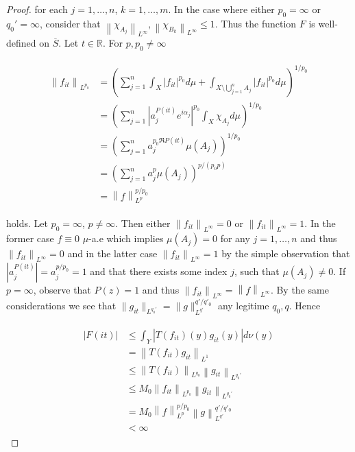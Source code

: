 \begin{proof}
for each $j = 1,\hdots,n$, $k = 1,\hdots,m$. In the case where either $p_0 = \infty$ or $q_0' = \infty$, consider that $\left\|\chi_{A_j} \right\|_{L^\infty}, \left\|\chi_{B_k}\right\|_{L^\infty} \leqslant 1 $. Thus the function $F$ is well-defined on $\overline{S}$. Let $t \in \mathbb{R}$. For $p,p_0 \neq \infty$

\begin{gather*}
	\begin{aligned}
		\left\|f_{it}\right\|_{L^{p_0}} &= \left(\sum_{j = 1}^n \int_X \left| f_{it} \right|^{p_0} d\mu + \int_{X \setminus \bigcup_{j = 1}^n A_j} \left| f_{it} \right|^{p_0} d\mu\right)^{1/p_0}\\
		&= \left(\sum_{j = 1}^n \left| a_j^{P(it)} e^{i\alpha_j}\right|^{p_0}\int_X \chi_{A_j} d\mu\right)^{1/p_0}\\
		&= \left(\sum_{j = 1}^n a_j^{p_0\Re P(it)}\mu\left(A_j\right)\right)^{1/p_0}\\
		&= \left(\sum_{j = 1}^n a_j^p\mu\left(A_j\right)\right)^{p/\left(p_0p\right)}\\
		&= \left\|f\right\|_{L^p}^{p/p_0} 
	\end{aligned}
\end{gather*}

holds. Let $p_0 = \infty$, $p \neq \infty$. Then either $\left\|f_{it}\right\|_{L^{\infty}} = 0$ or $\left\|f_{it}\right\|_{L^{\infty}} = 1$. In the former case $f \equiv 0$ $\mu$-a.e which implies $\mu\left( A_j \right) = 0$ for any $j = 1,\hdots,n$ and thus $\left\| f_{it}\right\|_{L^{\infty}} = 0$ and in the latter case $\left\| f_{it} \right\|_{L^{\infty}} = 1$ by the simple observation that $\left| a_j^{P(it)}\right| = a_j^{p/p_0} = 1$ and that there exists some index $j$, such that $\mu\left( A_j \right) \neq 0$. If $p = \infty$, observe that $P(z) = 1$ and thus $\left\| f_{it}\right\|_{L^{\infty}} = \left\| f\right\|_{L^{\infty}}$. By the same considerations we see that $\|g_{it}\|_{L^{q_0'}} = \|g\|_{L^{q'}}^{q'/q'_0}$ any legitime $q_0,q$. Hence

\begin{gather*}
	\begin{aligned}
		\left| F(it) \right| &\leqslant \int_Y \left| T(f_{it})(y)g_{it}(y)\right| d\nu(y)\\
		&= \left\|T(f_{it}) g_{it}\right\|_{L^1}\\
		&\leqslant \left\|T(f_{it})\right\|_{L^{q_0}}\left\|g_{it}\right\|_{L^{q_0'}}\\
		&\leqslant M_0 \left\|f_{it}\right\|_{L^{p_0}} \left\|g_{it}\right\|_{L^{q_0'}}\\
		&= M_0 \left\|f\right\|_{L^p}^{p/p_0} \left\|g\right\|_{L^{q'}}^{q'/q'_0}\\
		&< \infty
	\end{aligned}
\end{gather*}


\end{proof}
